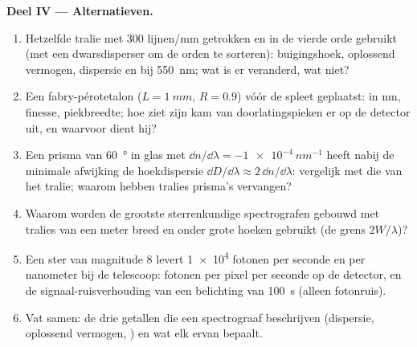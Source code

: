 \begin{problem}
\medskip
\noindent\textbf{Deel IV --- Alternatieven.}
\begin{enumerate}[resume]
  \item Hetzelfde tralie met $300$ lijnen/mm getrokken en in
        de vierde orde gebruikt (met een dwarsdisperser om de orden te sorteren):
        buigingshoek, oplossend vermogen, dispersie en  bij \qty{550}{nm}; wat is er veranderd, wat niet?
  \item Een fabry-pérotetalon ($L = \qty{1}{mm}$, $R = 0.9$) vóór
        de spleet geplaatst:  in nm, finesse, piekbreedte; hoe
        ziet zijn kam van doorlatingspieken er op de detector uit,
        en waarvoor dient hij?
  \item Een prisma van \qty{60}{\degree} in glas met
        $\dd n/\dd\lambda = \qty{-1e-4}{nm^{-1}}$
        heeft nabij de minimale afwijking de hoekdispersie
        $\dd D/\dd\lambda \approx 2\,\dd n/\dd\lambda$:
        vergelijk met die van het tralie; waarom hebben tralies
        prisma's vervangen?
  \item Waarom worden de grootste sterrenkundige spectrografen gebouwd met
        tralies van een meter breed en onder grote hoeken gebruikt (de grens
        $2W/\lambda$)?
  \item Een ster van magnitude 8 levert \qty{1e4}{} fotonen per seconde en
        per nanometer bij de telescoop: fotonen per pixel per seconde
        op de detector, en de signaal-ruisverhouding van een belichting van
        \qty{100}{s}
        (alleen fotonruis).
  \item Vat samen: de drie getallen die een spectrograaf beschrijven
        (dispersie, oplossend vermogen, ) en wat
        elk ervan bepaalt.
\end{enumerate}
\end{problem}
